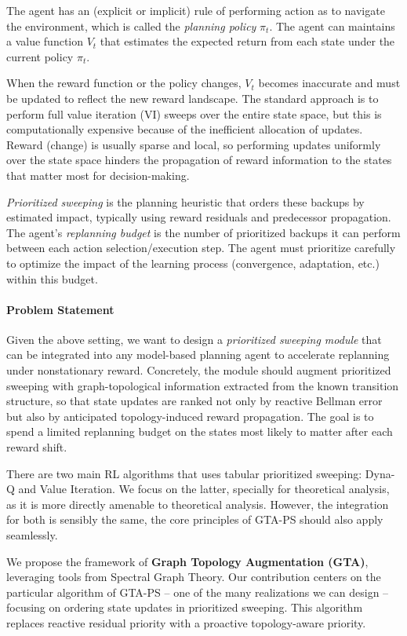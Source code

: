 \documentclass[10pt,a4paper]{article}
\begin{document}
The agent has an (explicit or implicit) rule of performing action as to navigate the environment, which is called the \textit{planning policy} $\pi_t$.
The agent can maintains a value function $V_t$ that estimates the expected return from each state under the current policy $\pi_t$.

When the reward function or the policy changes, $V_t$ becomes inaccurate and must be updated to reflect the new reward landscape.
The standard approach is to perform full value iteration (VI) sweeps over the entire state space, but this is computationally expensive because of the inefficient allocation of updates.
Reward (change) is usually sparse and local, so performing updates uniformly over the state space hinders the propagation of reward information to the states that matter most for decision-making.

\textit{Prioritized sweeping} is the planning heuristic that orders these backups by estimated impact, typically using reward residuals and predecessor propagation.
The agent's \textit{replanning budget} is the number of prioritized backups it can perform between each action selection/execution step.
The agent must prioritize carefully to optimize the impact of the learning process (convergence, adaptation, etc.) within this budget.


\paragraph{Problem Statement}
Given the above setting, we want to design a \textit{prioritized sweeping module} that can be integrated into any model-based planning agent to accelerate replanning under nonstationary reward. Concretely, the module should augment prioritized sweeping with graph-topological information extracted from the known transition structure, so that state updates are ranked not only by reactive Bellman error but also by anticipated topology-induced reward propagation. The goal is to spend a limited replanning budget on the states most likely to matter after each reward shift.

There are two main RL algorithms that uses tabular prioritized sweeping: Dyna-Q and Value Iteration.
We focus on the latter, specially for theoretical analysis, as it is more directly amenable to theoretical analysis.
However, the integration for both is sensibly the same, the core principles of GTA-PS should also apply seamlessly.

\vspace{0.4cm}
We propose the framework of \textbf{Graph Topology Augmentation (GTA)}, leveraging tools from Spectral Graph Theory.
Our contribution centers on the particular algorithm of GTA-PS -- one of the many realizations we can design -- focusing on ordering state updates in prioritized sweeping.
This algorithm replaces reactive residual priority with a proactive topology-aware priority.
\end{document}
